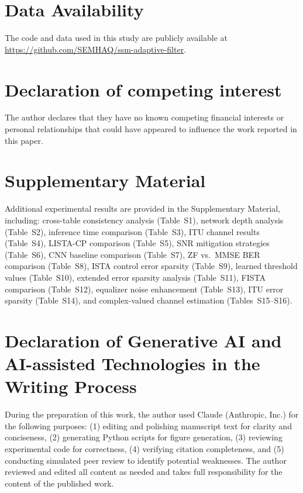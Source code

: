 \documentclass[a4paper,fleqn]{cas-sc}
\begin{document}
\section*{Data Availability}
The code and data used in this study are publicly available at \url{https://github.com/SEMHAQ/ssm-adaptive-filter}.

\section*{Declaration of competing interest}
The author declares that they have no known competing financial interests or personal relationships that could have appeared to influence the work reported in this paper.

\clearpage




\section*{Supplementary Material}
Additional experimental results are provided in the Supplementary Material, including: cross-table consistency analysis (Table~S1), network depth analysis (Table~S2), inference time comparison (Table~S3), ITU channel results (Table~S4), LISTA-CP comparison (Table~S5), SNR mitigation strategies (Table~S6), CNN baseline comparison (Table~S7), ZF vs.~MMSE BER comparison (Table~S8), ISTA control error sparsity (Table~S9), learned threshold values (Table~S10), extended error sparsity analysis (Table~S11), FISTA comparison (Table~S12), equalizer noise enhancement (Table~S13), ITU error sparsity (Table~S14), and complex-valued channel estimation (Tables~S15--S16).


\section*{Declaration of Generative AI and AI-assisted Technologies in the Writing Process}
During the preparation of this work, the author used Claude (Anthropic, Inc.) for the following purposes: (1) editing and polishing manuscript text for clarity and conciseness, (2) generating Python scripts for figure generation, (3) reviewing experimental code for correctness, (4) verifying citation completeness, and (5) conducting simulated peer review to identify potential weaknesses. The author reviewed and edited all content as needed and takes full responsibility for the content of the published work.
\end{document}
